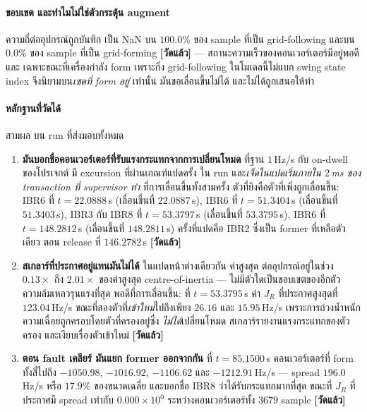 \documentclass[12pt,a4paper]{article}
\theoremstyle{remark}
\newcommand{\measured}{\textcolor{ok}{\textbf{[วัดแล้ว]}}}
\begin{document}
\paragraph{ขอบเขต และทำไมไม่ใช่ตัวกระตุ้น augment} ความถี่ต่ออุปกรณ์ถูกบันทึก
เป็น NaN บน $100.0\%$ ของ sample ที่เป็น grid-following และบน $0.0\%$ ของ sample
ที่เป็น grid-forming \measured{} --- สถานะความเร็วของคอนเวอร์เตอร์มีอยู่พอดีและ
เฉพาะขณะที่เครื่องกำลัง form เพราะกิ่ง grid-following ในโมเดลนี้ไม่แบก swing state
index จึงนิยามบน\emph{เซตที่ form อยู่} เท่านั้น มันขอเลื่อนขึ้นไม่ได้
และไม่ได้ถูกเสนอให้ทำ

\paragraph{หลักฐานที่วัดได้} สามผล บน run ที่ส่งมอบทั้งหมด

\begin{enumerate}[leftmargin=1.9em]
\item \textbf{มันบอกชื่อคอนเวอร์เตอร์ที่รับแรงกระแทกจากการเปลี่ยนโหมด}
      ที่ฐาน $1$\,Hz/s กับ on-dwell ของโปรเจกต์ มี excursion ที่ผ่านเกณฑ์แปดครั้ง
      ใน run และ\emph{เจ็ดในแปดเริ่มภายใน $2$\,ms ของ transaction ที่ supervisor ทำ}
      ที่การเลื่อนขึ้นทั้งสามครั้ง ตัวที่ยิงคือตัวที่เพิ่งถูกเลื่อนขึ้น:
      IBR6 ที่ $t = 22.0888$\,s (เลื่อนขึ้นที่ $22.0887$\,s),
      IBR6 ที่ $t = 51.3404$\,s (เลื่อนขึ้นที่ $51.3403$\,s),
      IBR3 กับ IBR8 ที่ $t = 53.3797$\,s (เลื่อนขึ้นที่ $53.3795$\,s),
      IBR6 ที่ $t = 148.2812$\,s (เลื่อนขึ้นที่ $148.2811$\,s) ครั้งที่แปดคือ IBR2
      ซึ่งเป็น former ที่เหลือตัวเดียว ตอน release ที่ $146.2782$\,s \measured
\item \textbf{สเกลาร์ที่ประกาศอยู่แทนมันไม่ได้} ในแปดหน้าต่างเดียวกัน ค่าสูงสุด
      ต่ออุปกรณ์อยู่ในช่วง $0.13\times$ ถึง $2.01\times$ ของค่าสูงสุด
      centre-of-inertia --- ไม่มีตัวใดเป็นขอบเขตของอีกตัว ความล้มเหลวรุนแรงที่สุด
      พอดีที่การเลื่อนขึ้น: ที่ $t = 53.3795$\,s ค่า $J_R$ ที่ประกาศสูงสุดที่
      $123.04$\,Hz/s ขณะที่สองตัวที่\emph{เข้าใหม่}ไปถึงเพียง $26.16$ และ
      $15.95$\,Hz/s เพราะการถ่วงน้ำหนักความเฉื่อยถูกครอบโดยตัวที่ครองอยู่ซึ่ง
      \emph{ไม่ได้}เปลี่ยนโหมด สเกลาร์รายงานแรงกระแทกของตัวครอง
      และเงียบเรื่องตัวเข้าใหม่ \measured
\item \textbf{ตอน fault เคลียร์ มันแยก former ออกจากกัน} ที่ $t = 85.1500$\,s
      คอนเวอร์เตอร์ที่ form ทั้งสี่ไปถึง $-1050.98$, $-1016.92$, $-1106.62$
      และ $-1212.91$\,Hz/s --- spread $196.0$\,Hz/s หรือ $17.9\%$ ของขนาดเฉลี่ย
      และบอกชื่อ IBR8 ว่าได้รับกระแทกมากที่สุด ขณะที่ $J_R$ ที่ประกาศมี spread
      เท่ากับ $0.000\times10^{0}$ ระหว่างคอนเวอร์เตอร์ทั้ง $3679$ sample \measured
\end{enumerate}
\end{document}
